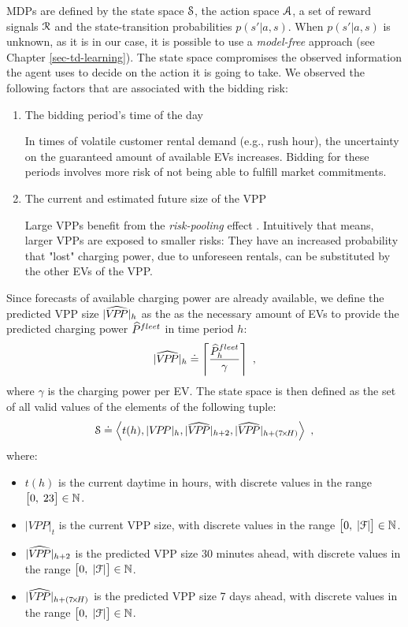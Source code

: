 \documentclass[a4paper, 12pt]{article}
\let\cite\shortcite
\begin{document}
MDPs are defined by the state space \(\S\), the action space \(\A\), a set of reward
signals \(\R\) and the state-transition probabilities \(p(s'|a,s)\). When
\(p(s'|a,s)\) is unknown, as it is in our case, it is possible to use a
\emph{model-free} approach (see Chapter \ref{sec-td-learning}). The state space
compromises the observed information the agent uses to decide on the action it
is going to take. We observed the following factors that are associated with the
bidding risk:
\begin{enumerate}
\item The bidding period's time of the day

In times of volatile customer rental demand (e.g., rush hour), the
uncertainty on the guaranteed amount of available EVs increases. Bidding for
these periods involves more risk of not being able to fulfill market
commitments.
\item The current and estimated future size of the VPP

Large VPPs benefit from the \emph{risk-pooling} effect \cite{kahlen17_fleet}.
Intuitively that means, larger VPPs are exposed to smaller risks: They have
an increased probability that "lost" charging power, due to unforeseen
rentals, can be substituted by the other EVs of the VPP.
\end{enumerate}
Since forecasts of available charging power are already available, we define the
predicted VPP size \(\vpphat{h}\) as the as the necessary amount of EVs to
provide the predicted charging power \(\fPhat{}\) in time period \(h\):
\begin{equation}
    \vpphat{h} \defeq \left\lceil\frac{\fPhat{h}}{\gamma}\right\rceil \text{ ,}
\end{equation}
where \(\gamma\) is the charging power per EV. The state space is then defined as
the set of all valid values of the elements of the following tuple:
\begin{equation}
    \S \defeq \left\langle t(h), \vpp{h}, \vpphat{h+2}, \vpphat{h+(7\!\times\!H)}\right\rangle \text{ ,}
\end{equation}
where:
\begin{itemize}
\item \(t(h)\) is the current daytime in hours, with discrete values in the range
\(\big[0,\;23\big] \in \Ne\).
\item \(|VPP|_t\) is the current VPP size, with discrete values in the range
\(\big[0,\;|\F|\big] \in \Ne\).
\item \(\vpphat{h+2}\) is the predicted VPP size 30 minutes ahead, with discrete values in the range
\(\big[0,\;|\F|\big] \in \Ne\).
\item \(\vpphat{h+(7\!\times\!H)}\) is the predicted VPP size 7 days ahead, with discrete
values in the range \(\big[0,\;|\F|\big] \in \Ne\).
\end{itemize}
\end{document}
